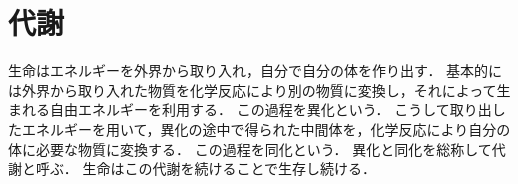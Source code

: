 \section{代謝}

生命はエネルギーを外界から取り入れ，自分で自分の体を作り出す．
基本的には外界から取り入れた物質を化学反応により別の物質に変換し，それによって生まれる自由エネルギーを利用する．
この過程を異化という．
こうして取り出したエネルギーを用いて，異化の途中で得られた中間体を，化学反応により自分の体に必要な物質に変換する．
この過程を同化という．
異化と同化を総称して代謝と呼ぶ．
生命はこの代謝を続けることで生存し続ける．
